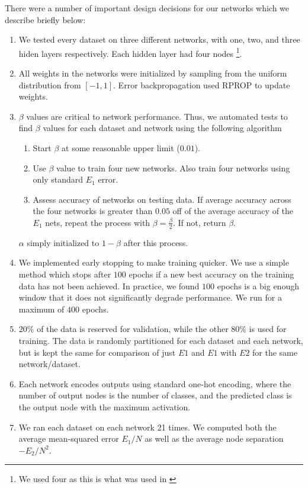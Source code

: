 There were a number of important design decisions for our networks
which we describe briefly below:

\begin{enumerate}
\item
  We tested every dataset on three different networks, with one,
  two, and three hiden layers respectively. Each hidden layer had
  four nodes \footnote{We used four as this is what was used in \cite{thuan11}}.
\item
  All weights in the networks were initialized by sampling from the
  uniform distribution from $[-1,1]$. Error backpropagation used RPROP
  to update weights.
\item
  $\beta$ values are critical to network performance. Thus, we automated
  tests to find $\beta$ values for each dataset and network using the
  following algorithm
  \begin{enumerate}
  \item
    Start $\beta$ at some reasonable upper limit ($0.01$).
  \item
    Use $\beta$ value to train four new networks. Also train four
    networks using only standard $E_1$ error.
  \item
    Assess accuracy of networks on testing data. If average accuracy
    across the four networks is greater than $0.05$ off of the average
    accuracy of the $E_1$ nets, repeat the process with
    $\beta = \frac{\beta}{2}$. If not, return $\beta$.    
  \end{enumerate}
  $\alpha$ simply initialized to $1-\beta$ after this process.
\item
  We implemented early stopping to make training quicker. We use a simple
  method which stops after $100$ epochs if a new best accuracy on the
  training data has not been achieved. In practice, we found $100$ epochs is
  a big enough window that it does not significantly degrade performance.
  We run for a maximum of $400$ epochs.
\item
  $20\%$ of the data is reserved for validation, while the other $80\%$ is
  used for training. The data is randomly partitioned for each dataset and
  each network, but is kept the same for comparison of just $E1$ and $E1$
  with $E2$ for the same network/dataset.
\item
  Each network encodes outputs using standard one-hot encoding, where the number
  of output nodes is the number of classes, and the predicted class is the
  output node with the maximum activation.
\item
  We ran each dataset on each network 21 times. We computed both the average
  mean-squared error $E_1/N$ as well as the average node separation
  $-E_2/N^2$.
\end{enumerate}

